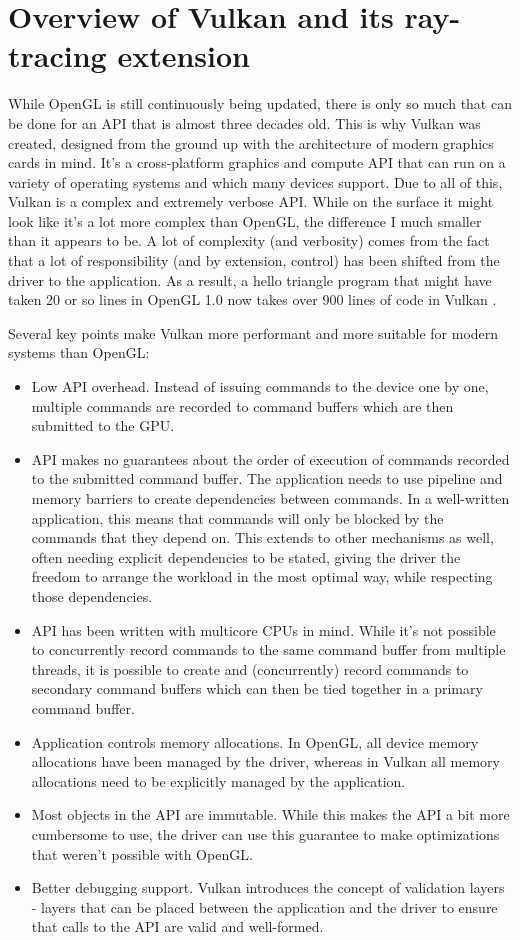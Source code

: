 \documentclass[times, utf8, zavrsni, numeric]{fer}
\begin{document}
\chapter{Overview of Vulkan and its ray-tracing extension}
While OpenGL is still continuously being updated, there is only so much that can be done for an API that is almost three decades old. This is why Vulkan was created, designed from the ground up with the architecture of modern graphics cards in mind. It's a cross-platform graphics and compute API that can run on a variety of operating systems and which many devices support. Due to all of this, Vulkan is a complex and extremely verbose API. While on the surface it might look like it's a lot more complex than OpenGL, the difference I much smaller than it appears to be. A lot of complexity (and verbosity) comes from the fact that a lot of responsibility (and by extension, control) has been shifted from the driver to the application. As a result, a hello triangle program that might have taken 20 or so lines in OpenGL 1.0 now takes over 900 lines of code in Vulkan \cite{vulkan_tutorial}.

Several key points make Vulkan more performant and more suitable for modern systems than OpenGL:
\begin{itemize}
\item Low API overhead. Instead of issuing commands to the device one by one, multiple commands are recorded to command buffers which are then submitted to the GPU.
\item API makes no guarantees about the order of execution of commands recorded to the submitted command buffer. The application needs to use pipeline and memory barriers to create dependencies between commands. In a well-written application, this means that commands will only be blocked by the commands that they depend on. This extends to other mechanisms as well, often needing explicit dependencies to be stated, giving the driver the freedom to arrange the workload in the most optimal way, while respecting those dependencies.
\item API has been written with multicore CPUs in mind. While it's not possible to concurrently record commands to the same command buffer from multiple threads, it is possible to create and (concurrently) record commands to secondary command buffers which can then be tied together in a primary command buffer.
\item Application controls memory allocations. In OpenGL, all device memory allocations have been managed by the driver, whereas in Vulkan all memory allocations need to be explicitly managed by the application.
\item Most objects in the API are immutable. While this makes the API a bit more cumbersome to use, the driver can use this guarantee to make optimizations that weren't possible with OpenGL.
\item Better debugging support. Vulkan introduces the concept of validation layers - layers that can be placed between the application and the driver to ensure that calls to the API are valid and well-formed.
\end{itemize}
\end{document}
